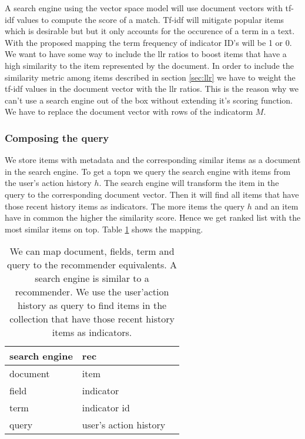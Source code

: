 A search engine using the vector space model will use document vectors with tf-idf values to compute the score of a match. Tf-idf will mitigate popular items which is desirable but but it only accounts for the occurence of a term in a text. With the proposed mapping the term frequency of indicator ID's will be 1 or 0. We want to have some way to include the \gls{llr} ratios to boost items that have a high similarity to the item represented by the document. In order to include the similarity metric among items described in section \ref{sec:llr} we have to weight the tf-idf values in the document vector with the \gls{llr} ratios. This is the reason why we can't use a search engine out of the box without extending it's scoring function.
We have to replace the document vector with rows of the \gls{indicatorm} $M$. 

\subsubsection{Composing the query}
We store items with metadata and the corresponding similar items as a document in the search engine. To get a \gls{topn} we query the search engine with items from the user's action history $h$. The search engine will transform the item in the query to the corresponding document vector. Then it will find all items that have those recent history items as indicators. The more items the query $h$ and an item have in common the higher the similarity score. Hence we get ranked list with the most similar items on top. Table \ref{tbl:comparison} shows the mapping.

\begin{table}
\begin{center}
\begin{tabular}{lll}
 search engine & \gls{rec}\\ \hline
  document & item\\ 
 field & indicator \\
 term & indicator id    \\
 query & user's action history \\
\end{tabular}
\end{center}
\caption{We can map document, fields, term and query to the recommender equivalents. A search engine is similar to a recommender. We use the user'action history as query to find items in the collection that have those recent history items as indicators. }
\label{tbl:comparison}
\end{table}

